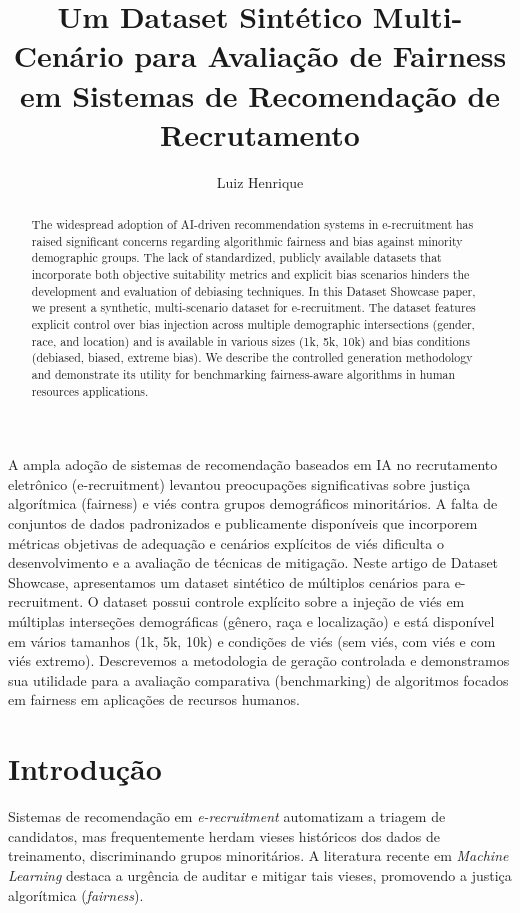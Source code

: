 \documentclass[12pt]{article}
\title{Um Dataset Sintético Multi-Cenário para Avaliação de Fairness em Sistemas de Recomendação de Recrutamento}
\author{Luiz Henrique\inst{1}}
\begin{document}
\maketitle

\begin{abstract}
The widespread adoption of AI-driven recommendation systems in e-recruitment has raised significant concerns regarding algorithmic fairness and bias against minority demographic groups. The lack of standardized, publicly available datasets that incorporate both objective suitability metrics and explicit bias scenarios hinders the development and evaluation of debiasing techniques. In this Dataset Showcase paper, we present a synthetic, multi-scenario dataset for e-recruitment. The dataset features explicit control over bias injection across multiple demographic intersections (gender, race, and location) and is available in various sizes (1k, 5k, 10k) and bias conditions (debiased, biased, extreme bias). We describe the controlled generation methodology and demonstrate its utility for benchmarking fairness-aware algorithms in human resources applications.
\end{abstract}

\begin{resumo}
A ampla adoção de sistemas de recomendação baseados em IA no recrutamento eletrônico (e-recruitment) levantou preocupações significativas sobre justiça algorítmica (fairness) e viés contra grupos demográficos minoritários. A falta de conjuntos de dados padronizados e publicamente disponíveis que incorporem métricas objetivas de adequação e cenários explícitos de viés dificulta o desenvolvimento e a avaliação de técnicas de mitigação. Neste artigo de Dataset Showcase, apresentamos um dataset sintético de múltiplos cenários para e-recruitment. O dataset possui controle explícito sobre a injeção de viés em múltiplas interseções demográficas (gênero, raça e localização) e está disponível em vários tamanhos (1k, 5k, 10k) e condições de viés (sem viés, com viés e com viés extremo). Descrevemos a metodologia de geração controlada e demonstramos sua utilidade para a avaliação comparativa (benchmarking) de algoritmos focados em fairness em aplicações de recursos humanos.
\end{resumo}

\section{Introdução}

Sistemas de recomendação em \textit{e-recruitment} automatizam a triagem de candidatos, mas frequentemente herdam vieses históricos dos dados de treinamento, discriminando grupos minoritários. A literatura recente em \textit{Machine Learning} destaca a urgência de auditar e mitigar tais vieses, promovendo a justiça algorítmica (\textit{fairness}).
\end{document}
